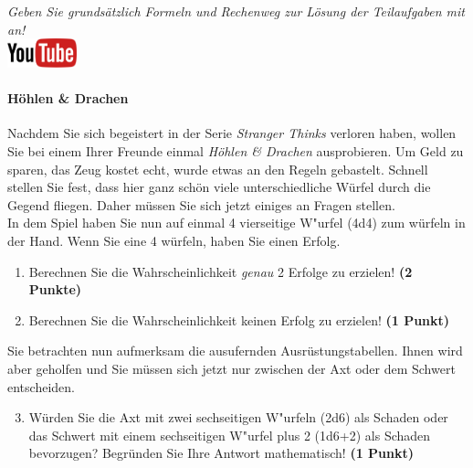 \documentclass[a4paper, 9pt]{scrartcl}\usepackage[]{graphicx}\usepackage[]{xcolor}
\begin{document}
\textit{Geben Sie grunds{\"a}tzlich Formeln und Rechenweg zur L{\"o}sung der
  Teilaufgaben mit an!} \\[1Ex]

\hfill\href{https://youtu.be/8Pb2sKUIMyk}{\includegraphics[width =
  2cm]{img/youtube}} %
\hspace{2Ex}

\paragraph{H{\"o}hlen \& Drachen}



Nachdem Sie sich begeistert in der Serie \textit{Stranger Thinks} verloren
haben, wollen Sie bei einem Ihrer Freunde einmal \textit{H{\"o}hlen \& Drachen}
ausprobieren. Um Geld zu sparen, das Zeug kostet echt, wurde etwas an den
Regeln gebastelt. Schnell stellen Sie fest, dass hier ganz sch{\"o}n viele
unterschiedliche W{\"u}rfel durch die Gegend fliegen. Daher m{\"u}ssen Sie sich
jetzt einiges an Fragen stellen. \\%

In dem Spiel haben Sie nun auf einmal 4 vierseitige W{"u}rfel (4d4) zum w{\"u}rfeln in der Hand. Wenn Sie eine 4 w{\"u}rfeln,
haben Sie einen Erfolg.

\begin{enumerate}
\item Berechnen Sie die Wahrscheinlichkeit \textit{genau}
  2 Erfolge zu erzielen!  \textbf{(2 Punkte)}
\item Berechnen Sie die Wahrscheinlichkeit keinen Erfolg zu erzielen!
  \textbf{(1 Punkt)}
\end{enumerate}

Sie betrachten nun aufmerksam die ausufernden Ausr{\"u}stungstabellen. Ihnen
wird aber geholfen und Sie m{\"u}ssen sich jetzt nur zwischen der Axt oder dem
Schwert entscheiden.

\begin{enumerate}
  \setcounter{enumi}{2}
\item W{\"u}rden Sie die Axt mit zwei sechseitigen W{"u}rfeln (2d6) als Schaden oder
  das Schwert mit einem sechseitigen W{"u}rfel plus 2 (1d6+2) als Schaden bevorzugen?
  Begr{\"u}nden Sie Ihre Antwort mathematisch! \textbf{(1 Punkt)}
\end{enumerate}
\end{document}
